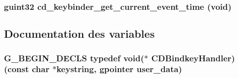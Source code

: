 \subsubsection{\setlength{\rightskip}{0pt plus 5cm}guint32 cd\_\-keybinder\_\-get\_\-current\_\-event\_\-time (void)}\label{cairo-dock-keybinder_8h_0307096a47d8b31392edaba7022b73d6}




\subsection{Documentation des variables}
\subsubsection{\setlength{\rightskip}{0pt plus 5cm}G\_\-BEGIN\_\-DECLS typedef void($\ast$  {\bf CDBindkeyHandler})(const char $\ast$keystring, gpointer user\_\-data)}\label{cairo-dock-keybinder_8h_27d1955e794b8c5feedb22b98bcdcb13}


